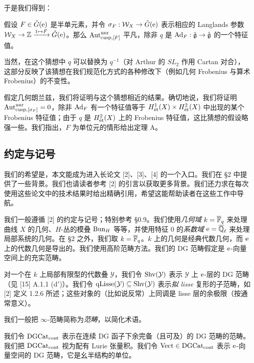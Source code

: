 于是我们得到：

\begin{conj}
假设 $F \in \bG(\e)$ 是半单元素，并令 $\sigma_F: \mathcal{W}_X \to \bG(\e)$ 表示相应的 Langlands 参数 $\mathcal{W}_X \to \ZZ \xrightarrow{1 \mapsto F} \bG(\e)$。那么 $\Aut^{\unr}_{\cusp,[F]}$ 平凡，除非 $q$ 是 $\Ad_F: \bg \to \bg$ 的一个特征值。
\end{conj}

\begin{remark}
当然，在这个猜想中 $q$ 可以替换为 $q^{-1}$（对 Arthur 的 $SL_2$ 作用 Cartan 对合），这部分反映了该猜想在我们规范化方式的各种修改下（例如几何 Frobenius 与算术 Frobenius）的不变性。
\end{remark}

\pnum{}假定几何朗兰兹，我们将证明与这个猜想相近的结果。确切地说，我们将证明 $\Aut^{\unr}_{\cusp,[\sigma_F]} = 0$，除非 $\Ad_F$ 有一个特征值等于 $H^1_{\et}(X) \times H^2_{\et}(X)$ 中出现的某个 Frobenius 特征值；由于 $q$ 是 $H^2_{\et}(X)$ 上的 Frobenius 特征值，这比猜想的假设略强一些。我们指出，$F$ 为单位元的情形给出定理 A。

\subsection{约定与记号}

我们的希望是，本文能成为进入长论文 [2]、[3]、[4] 的一个入口。我们在 §2 中提供了一些背景。我们也请读者参考 [2] 的引言以获取更多背景。我们还力求在每次使用这些论文中的技术结果时给出精确引用，希望这能帮助读者在这些工作中导航。

我们一般遵循 [2] 的约定与记号；特别参考 §0.9。我们使用\emph{几何域} $k = \Fb$ 来处理曲线 $X$ 的几何、$H$-丛的模叠 $\Bun_H$ 等等，并使用特征 $0$ 的\emph{系数域} $\e = \overline{\Q}_\ell$ 来处理局部系统的几何。在 §2 之外，我们取 $k = \Fb$。$k$ 上的几何是经典代数几何，而 $\e$ 上的代数几何是导出的。我们使用高阶范畴方法。我们的 DG 范畴假定是 $\e$-向量空间上的充实范畴。

对一个在 $k$ 上局部有限型的代数叠 $\mathcal{Y}$，我们令 $\Shv(\mathcal{Y})$ 表示 $\mathcal{Y}$ 上 $\e$-层的 DG 范畴（见 [15] A.1.1 (d$'$)）。我们令 $\qLisse(\mathcal{Y}) \subseteq \Shv(\mathcal{Y})$ 表示\emph{拟 lisse} 复形的子范畴，如 [2] 定义 1.2.6 所述；这些对象的（比如说反常）上同调是 lisse 层的余极限（按通常意义）。

我们一般把 $\infty$-范畴简称为\emph{范畴}，以简化术语。

我们令 $\DGCat_{\mathrm{cont}}$ 表示在连续 DG 函子下余完备（且可及）的 DG 范畴的范畴。我们把 $\DGCat_{\mathrm{cont}}$ 视为配有 Lurie 张量积。我们令 $\Vect \in \DGCat_{\mathrm{cont}}$ 表示 $\e$-向量空间的 DG 范畴，它是幺半结构的单位。

